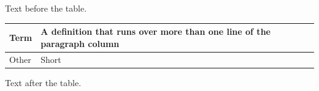 \documentclass[12pt]{article}
\begin{document}
Text before the table.

\begin{tabular}{|l|p{5cm}|}\hline Term & A definition that runs over more than one line of the paragraph column\\\hline Other & Short\\\hline\end{tabular}

Text after the table.
\end{document}
